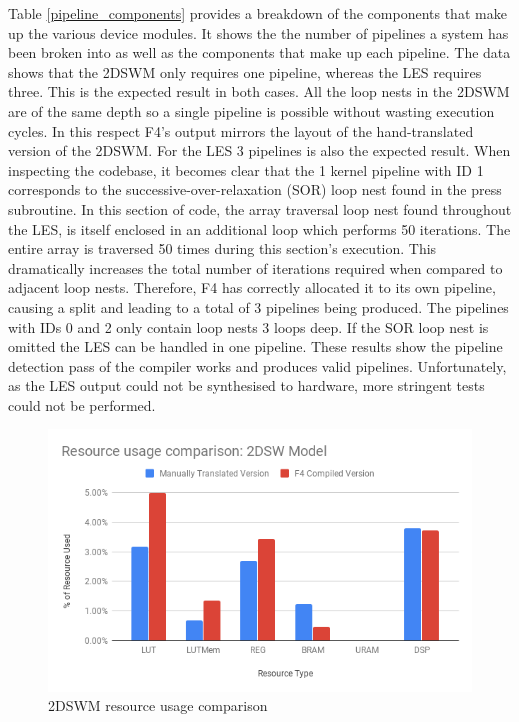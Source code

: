\documentclass{mpaper}
\begin{document}
Table \ref{pipeline_components} provides a breakdown of the components that make up the various device modules. 
It shows the the number of pipelines a system has been broken into as well as the components that make up each pipeline.
The data shows that the 2DSWM only requires one pipeline, whereas the LES requires three. 
This is the expected result in both cases.
All the loop nests in the 2DSWM are of the same depth so a single pipeline is possible without wasting execution cycles.
In this respect F4's output mirrors the layout of the hand-translated version of the 2DSWM.
For the LES 3 pipelines is also the expected result. 
When inspecting the codebase, it becomes clear that the 1 kernel pipeline with ID 1 corresponds to the successive-over-relaxation (SOR) loop nest found in the press subroutine. 
In this section of code, the array traversal loop nest found throughout the LES, is itself enclosed in an additional loop which performs 50 iterations.
The entire array is traversed 50 times during this section's execution.
This dramatically increases the total number of iterations required when compared to adjacent loop nests.
Therefore, F4 has correctly allocated it to its own pipeline, causing a split and leading to a total of 3 pipelines being produced. 
The pipelines with IDs 0 and 2 only contain loop nests 3 loops deep.
If the SOR loop nest is omitted the LES can be handled in one pipeline.
These results show the pipeline detection pass of the compiler works and produces valid pipelines. 
Unfortunately, as the LES output could not be synthesised to hardware, more stringent tests could not be performed. 

\begin{figure}
    \centering
    \includegraphics[scale=0.4]{images/Resource_usage_comparison_2DSW_Model.png}
    \caption{2DSWM resource usage comparison}
    \label{fig:resource_usage}
\end{figure}
\end{document}
